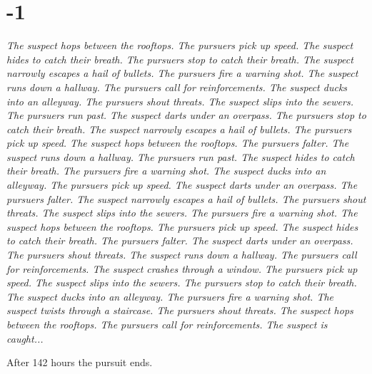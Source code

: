 \documentclass{report}
\begin{document}
\section*{-1}\textit{The suspect hops between the rooftops. The pursuers pick up speed. The suspect hides to catch their breath. The pursuers stop to catch their breath. The suspect narrowly escapes a hail of bullets. The pursuers fire a warning shot. The suspect runs down a hallway. The pursuers call for reinforcements. The suspect ducks into an alleyway. The pursuers shout threats. The suspect slips into the sewers. The pursuers run past. The suspect darts under an overpass. The pursuers stop to catch their breath. The suspect narrowly escapes a hail of bullets. The pursuers pick up speed. The suspect hops between the rooftops. The pursuers falter. The suspect runs down a hallway. The pursuers run past. The suspect hides to catch their breath. The pursuers fire a warning shot. The suspect ducks into an alleyway. The pursuers pick up speed. The suspect darts under an overpass. The pursuers falter. The suspect narrowly escapes a hail of bullets. The pursuers shout threats. The suspect slips into the sewers. The pursuers fire a warning shot. The suspect hops between the rooftops. The pursuers pick up speed. The suspect hides to catch their breath. The pursuers falter. The suspect darts under an overpass. The pursuers shout threats. The suspect runs down a hallway. The pursuers call for reinforcements. The suspect crashes through a window. The pursuers pick up speed. The suspect slips into the sewers. The pursuers stop to catch their breath. The suspect ducks into an alleyway. The pursuers fire a warning shot. The suspect twists through a staircase. The pursuers shout threats. The suspect hops between the rooftops. The pursuers call for reinforcements. The suspect is caught...}


After 142 hours the pursuit ends.
\end{document}
